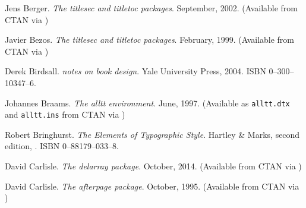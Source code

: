 \begin{thebibliography}{GMS94A}
\begin{comment}
\bibitem[Boh90]{BOHLE90}
  Robert Bohle.
  \newblock \emph{Publication Design for Editors}.
  \newblock Prentice-Hall,
  \newblock 1990.
\end{comment}

  Jens Berger.
  \newblock \emph{The titlesec and titletoc packages}.
  \newblock September, 2002.
  \newblock (Available from CTAN via
             )

  Javier Bezos.
  \newblock \emph{The titlesec and titletoc packages}.
  \newblock February, 1999.
  \newblock (Available from CTAN via 
             )

  Derek Birdsall.
  \newblock \emph{notes on book design}.
  \newblock Yale University Press, 2004.
  \newblock ISBN 0--300--10347--6.

\begin{comment}
\bibitem[Bra94]{MAKEIDX}
  Johannes Braams \textit{et al}.
  \newblock \emph{Standard LaTeX2e packages makeidx and showidx}.
  \newblock November, 1994.
  \newblock (Available from CTAN as 
             \url{/macros/latex/base/makeindx.dtx(ins)})
\end{comment}

  Johannes Braams.
  \newblock \emph{The alltt environment}.
  \newblock June, 1997.
  \newblock (Available as \texttt{alltt.dtx} and 
  \texttt{alltt.ins} from CTAN via  )

  Robert Bringhurst.
  \newblock \emph{The Elements of Typographic Style}.
  \newblock Hartley \& Marks, second edition,
  . ISBN 0--88179--033--8.

\begin{comment}
\bibitem[Bur59]{BURT59}
  C.~L.~Burt.
  \newblock \emph{A Psychological Study of Typography}.
  \newblock Cambridge University Press,
  \newblock 1959.
\end{comment}

  David Carlisle.
  \newblock \emph{The delarray package}.
  \newblock October, 2014.
  \newblock (Available from CTAN via
             )

  David Carlisle.
  \newblock \emph{The afterpage package}.
  \newblock October, 1995.
  \newblock (Available from CTAN via
             )


\end{thebibliography}
